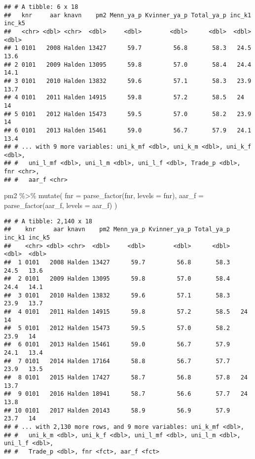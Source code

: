 \documentclass[
]{article}
\newenvironment{Shaded}{\begin{snugshade}}{\end{snugshade}}
\newcommand{\AttributeTok}[1]{\textcolor[rgb]{0.77,0.63,0.00}{#1}}
\newcommand{\FunctionTok}[1]{\textcolor[rgb]{0.00,0.00,0.00}{#1}}
\newcommand{\NormalTok}[1]{#1}
\newcommand{\SpecialCharTok}[1]{\textcolor[rgb]{0.00,0.00,0.00}{#1}}
\begin{document}
\begin{verbatim}
## # A tibble: 6 x 18
##   knr     aar knavn    pm2 Menn_ya_p Kvinner_ya_p Total_ya_p inc_k1 inc_k5
##   <chr> <dbl> <chr>  <dbl>     <dbl>        <dbl>      <dbl>  <dbl>  <dbl>
## 1 0101   2008 Halden 13427      59.7         56.8       58.3   24.5   13.6
## 2 0101   2009 Halden 13095      59.8         57.0       58.4   24.4   14.1
## 3 0101   2010 Halden 13832      59.6         57.1       58.3   23.9   13.7
## 4 0101   2011 Halden 14915      59.8         57.2       58.5   24     14  
## 5 0101   2012 Halden 15473      59.5         57.0       58.2   23.9   14  
## 6 0101   2013 Halden 15461      59.0         56.7       57.9   24.1   13.4
## # ... with 9 more variables: uni_k_mf <dbl>, uni_k_m <dbl>, uni_k_f <dbl>,
## #   uni_l_mf <dbl>, uni_l_m <dbl>, uni_l_f <dbl>, Trade_p <dbl>, fnr <chr>,
## #   aar_f <chr>
\end{verbatim}

\begin{Shaded}
\begin{Highlighting}[]
\NormalTok{pm2 }\SpecialCharTok{\%\textgreater{}\%} 
  \FunctionTok{mutate}\NormalTok{(}
    \AttributeTok{fnr =} \FunctionTok{parse\_factor}\NormalTok{(fnr, }\AttributeTok{levels =}\NormalTok{ fnr),}
    \AttributeTok{aar\_f =} \FunctionTok{parse\_factor}\NormalTok{(aar\_f, }\AttributeTok{levels =}\NormalTok{ aar\_f)}
\NormalTok{  )}
\end{Highlighting}
\end{Shaded}

\begin{verbatim}
## # A tibble: 2,140 x 18
##    knr     aar knavn    pm2 Menn_ya_p Kvinner_ya_p Total_ya_p inc_k1 inc_k5
##    <chr> <dbl> <chr>  <dbl>     <dbl>        <dbl>      <dbl>  <dbl>  <dbl>
##  1 0101   2008 Halden 13427      59.7         56.8       58.3   24.5   13.6
##  2 0101   2009 Halden 13095      59.8         57.0       58.4   24.4   14.1
##  3 0101   2010 Halden 13832      59.6         57.1       58.3   23.9   13.7
##  4 0101   2011 Halden 14915      59.8         57.2       58.5   24     14  
##  5 0101   2012 Halden 15473      59.5         57.0       58.2   23.9   14  
##  6 0101   2013 Halden 15461      59.0         56.7       57.9   24.1   13.4
##  7 0101   2014 Halden 17164      58.8         56.7       57.7   23.9   13.5
##  8 0101   2015 Halden 17427      58.7         56.8       57.8   24     13.7
##  9 0101   2016 Halden 18941      58.7         56.6       57.7   24     13.8
## 10 0101   2017 Halden 20143      58.9         56.9       57.9   23.7   14  
## # ... with 2,130 more rows, and 9 more variables: uni_k_mf <dbl>,
## #   uni_k_m <dbl>, uni_k_f <dbl>, uni_l_mf <dbl>, uni_l_m <dbl>, uni_l_f <dbl>,
## #   Trade_p <dbl>, fnr <fct>, aar_f <fct>
\end{verbatim}
\end{document}
